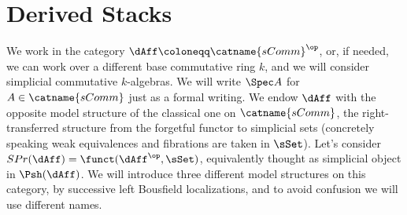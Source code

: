     \section{Derived Stacks}
        We work in the category $\dAff \coloneqq \catname{sComm}^{\op}$, or, if needed, we can work over a different base commutative ring $k$, and we will consider simplicial commutative $k$-algebras. We will write $\Spec  A$ for $A \in \catname{sComm}$ just as a formal writing. We endow $\dAff$ with the opposite model structure of the classical one on $\catname{sComm}$, the right-transferred structure from the forgetful functor to simplicial sets (concretely speaking weak equivalences and fibrations are taken in $\sSet$).
        Let's consider $SPr(\dAff) = \funct(\dAff^{\op}, \sSet)$, equivalently thought as simplicial object in $\Psh(\dAff)$. We will introduce three different model structures on this category, by successive left Bousfield localizations, and to avoid confusion we will use different names.
